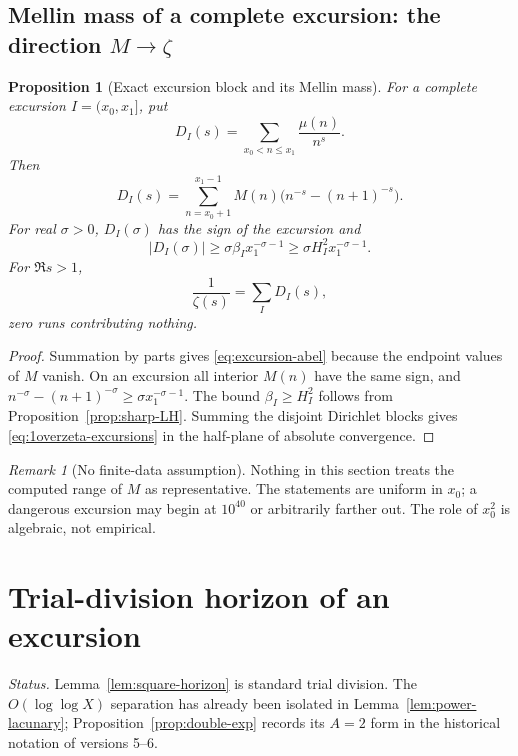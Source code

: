 \documentclass[11pt]{amsart}
\numberwithin{equation}{section}
\theoremstyle{plain}
\newtheorem{proposition}[theorem]{Proposition}
\theoremstyle{definition}
\theoremstyle{remark}
\newtheorem{remark}[theorem]{Remark}
\begin{document}
\subsection{Mellin mass of a complete excursion: the direction $M\to\zeta$}

\begin{proposition}[Exact excursion block and its Mellin mass]
\label{prop:excursion-mellin}
For a complete excursion $I=(x_0,x_1]$, put
\[
D_I(s)=\sum_{x_0<n\le x_1}\frac{\mu(n)}{n^s}.
\]
Then
\begin{equation}
\label{eq:excursion-abel}
D_I(s)=\sum_{n=x_0+1}^{x_1-1}M(n)
\bigl(n^{-s}-(n+1)^{-s}\bigr).
\end{equation}
For real $\sigma>0$, $D_I(\sigma)$ has the sign of the excursion and
\begin{equation}
\label{eq:excursion-mass-lower}
|D_I(\sigma)|\ge
\sigma\beta_I x_1^{-\sigma-1}
\ge\sigma H_I^2x_1^{-\sigma-1}.
\end{equation}
For $\Re s>1$,
\begin{equation}
\label{eq:1overzeta-excursions}
\frac1{\zeta(s)}=\sum_I D_I(s),
\end{equation}
zero runs contributing nothing.
\end{proposition}

\begin{proof}
Summation by parts gives \eqref{eq:excursion-abel} because the endpoint
values of $M$ vanish. On an excursion all interior $M(n)$ have the same
sign, and
$n^{-\sigma}-(n+1)^{-\sigma}\ge\sigma x_1^{-\sigma-1}$. The bound
$\beta_I\ge H_I^2$ follows from Proposition~\ref{prop:sharp-LH}. Summing the
disjoint Dirichlet blocks gives \eqref{eq:1overzeta-excursions} in the
half-plane of absolute convergence.
\end{proof}

\begin{remark}[No finite-data assumption]
\label{rem:no-finite-data}
Nothing in this section treats the computed range of $M$ as representative.
The statements are uniform in $x_0$; a dangerous excursion may begin at
$10^{40}$ or arbitrarily farther out. The role of $x_0^2$ is algebraic, not
empirical.
\end{remark}

\section{Trial-division horizon of an excursion}
\label{sec:prime_horizon}

\noindent\emph{Status.} Lemma~\ref{lem:square-horizon} is standard trial
division. The $O(\log\log X)$ separation has already been isolated in
Lemma~\ref{lem:power-lacunary}; Proposition~\ref{prop:double-exp} records its
$A=2$ form in the historical notation of versions 5--6.
\end{document}
